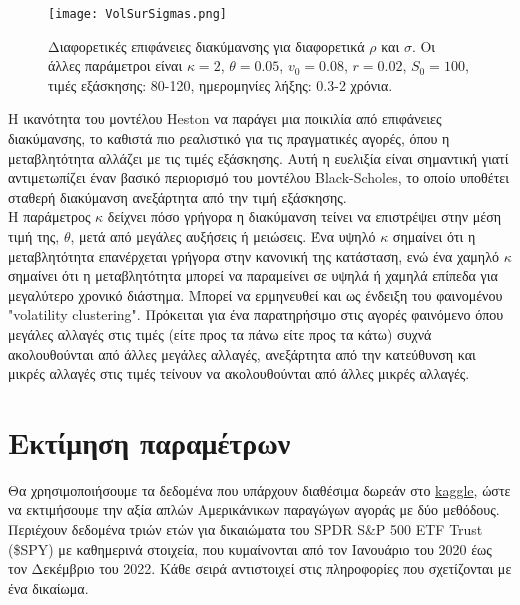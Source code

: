 \documentclass[12pt,a4paper,twoside,openany]{book}
\begin{document}
	\begin{figure}[h]
		\centering
		\texttt{[image: VolSurSigmas.png]}
		\caption{Διαφορετικές επιφάνειες διακύμανσης για διαφορετικά $\rho$ και $\sigma$. Οι άλλες παράμετροι είναι $\kappa=2$, $\theta=0.05$, $v_0=0.08$, $r=0.02$, $S_0=100$, τιμές εξάσκησης: 80-120, ημερομηνίες λήξης: 0.3-2 χρόνια.}
		\label{fig:VolSurSigmas}
	\end{figure}
	
	\noindent Η ικανότητα του μοντέλου Heston να παράγει μια ποικιλία από επιφάνειες διακύμανσης, το καθιστά πιο ρεαλιστικό για τις πραγματικές αγορές, όπου η μεταβλητότητα αλλάζει με τις τιμές εξάσκησης. Αυτή η ευελιξία είναι σημαντική γιατί αντιμετωπίζει έναν βασικό περιορισμό του μοντέλου Black-Scholes, το οποίο υποθέτει σταθερή διακύμανση ανεξάρτητα από την τιμή εξάσκησης. 
	\vspace{2.5mm}\\
	Η παράμετρος $\kappa$ δείχνει πόσο γρήγορα η διακύμανση τείνει να επιστρέψει στην μέση τιμή της, $\theta$, μετά από μεγάλες αυξήσεις ή μειώσεις. Ένα υψηλό $\kappa$ σημαίνει ότι η μεταβλητότητα επανέρχεται γρήγορα στην κανονική της κατάσταση, ενώ ένα χαμηλό $\kappa$ σημαίνει ότι η μεταβλητότητα μπορεί να παραμείνει σε υψηλά ή χαμηλά επίπεδα για μεγαλύτερο χρονικό διάστημα. Μπορεί να ερμηνευθεί και ως ένδειξη του φαινομένου "volatility clustering". Πρόκειται για ένα παρατηρήσιμο στις αγορές φαινόμενο όπου μεγάλες αλλαγές στις τιμές (είτε προς τα πάνω είτε προς τα κάτω) συχνά ακολουθούνται από άλλες μεγάλες αλλαγές, ανεξάρτητα από την κατεύθυνση και μικρές αλλαγές στις τιμές τείνουν να ακολουθούνται από άλλες μικρές αλλαγές.


 	
 	
 	
 	
\section{Εκτίμηση παραμέτρων}
\vspace{2.5mm}
	Θα χρησιμοποιήσουμε τα δεδομένα που υπάρχουν διαθέσιμα δωρεάν στο \href{https://www.kaggle.com/datasets/kylegraupe/spy-daily-eod-options-quotes-2020-2022}{kaggle}, ώστε να εκτιμήσουμε την αξία απλών Αμερικάνικων παραγώγων αγοράς με δύο μεθόδους. Περιέχουν δεδομένα τριών ετών για δικαιώματα του SPDR S\&P 500 ETF Trust (\$SPY)  με καθημερινά στοιχεία, που κυμαίνονται από τον Ιανουάριο του 2020 έως τον Δεκέμβριο του 2022. Κάθε σειρά αντιστοιχεί στις πληροφορίες που σχετίζονται με ένα δικαίωμα.
	
\end{document}

